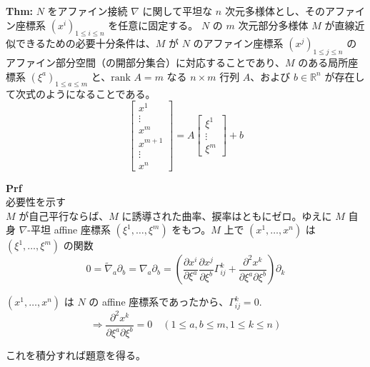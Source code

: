 \documentclass[a4paper,11pt]{jsarticle}
\numberwithin{equation}{section}
\begin{document}
\begin{itembox}[l]{\textbf{Thm:}}
    $N$ をアファイン接続 \(\nabla\) に関して平坦な \(n\) 次元多様体とし、そのアファイン座標系 \( (x^i)_{1 \leq i \leq n} \) を任意に固定する。
    \(N\) の \(m\) 次元部分多様体 \(M\) が直線近似できるための必要十分条件は、\(M\) が \(N\) のアファイン座標系 \( (x^j)_{1 \leq j \leq n} \) のアファイン部分空間（の開部分集合）に対応することであり、\(M\) のある局所座標系 \( (\xi^a)_{1 \leq a \leq m} \) と、\( \text{rank } A = m \) なる \(n \times m\) 行列 \(A\)、および \(b \in \mathbb{R}^n\) が存在して次式のようになることである。
\begin{equation}
    \begin{bmatrix}
        x^1 \\
        \vdots \\
        x^m \\
        x^{m+1} \\
        \vdots \\
        x^n
    \end{bmatrix} = A \begin{bmatrix}
        \xi^1 \\
        \vdots \\
        \xi^m
    \end{bmatrix} + b
\end{equation}


\end{itembox}
\textbf{Prf}\\
必要性を示す\\
\(M\) が自己平行ならば、\(M\) に誘導された曲率、捩率はともにゼロ。ゆえに \(M\) 自身 \(\nabla\)-平坦 affine 座標系 \((\xi^1, \ldots, \xi^m)\) をもつ。\(M\) 上で \((x^1, \ldots, x^n)\) は \((\xi^1, \ldots, \xi^m)\) の関数
\begin{equation}
0 = \tilde{\nabla}_a \partial_b = \nabla_a \partial_b = \left( \frac{\partial x^i}{\partial \xi^a} \frac{\partial x^j}{\partial \xi^b} \Gamma_{ij}^k + \frac{\partial^2 x^k}{\partial \xi^a \partial \xi^b} \right) \partial_k 
\end{equation}

\((x^1, \ldots, x^n)\) は \(N\) の affine 座標系であったから、\(\Gamma_{ij}^k = 0\).
\begin{equation}
\Rightarrow \frac{\partial^2 x^k}{\partial \xi^a \partial \xi^b} = 0 \quad (1 \leq a, b \leq m, 1 \leq k \leq n) 
\end{equation}

これを積分すれば題意を得る。
\end{document}
